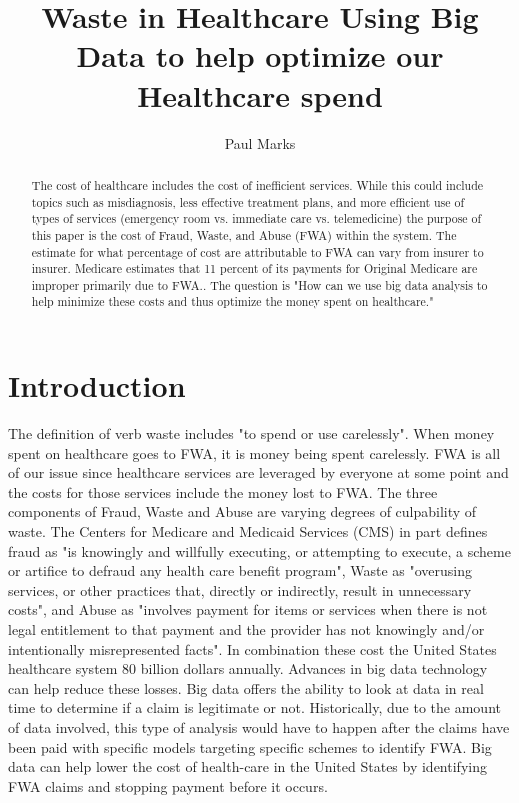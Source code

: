 \documentclass[sigconf]{acmart}
\begin{document}
\title{Waste in Healthcare
Using Big Data to help optimize our Healthcare spend}


\author{Paul Marks}


\begin{abstract}
The cost of healthcare includes the cost of inefficient services.  While this 
could include topics such as misdiagnosis, less effective treatment plans, 
and more efficient use of types of services (emergency room vs. immediate care 
vs. telemedicine) the purpose of this paper is the cost of Fraud, Waste, and 
Abuse (FWA) within the system.  The estimate for what percentage of cost are 
attributable to FWA can vary from insurer to insurer.  Medicare estimates that 
11 percent of its payments for Original Medicare are improper primarily due to 
FWA.\cite{FY2016HHSFR}.   The question is "How can we use big data analysis to 
help minimize these costs and thus optimize the money spent on healthcare."
\end{abstract}



\maketitle

\section{Introduction}

The definition of verb waste includes "to spend or use carelessly"\cite{WasteDef}.  
When money spent on healthcare goes to FWA, it is money being spent carelessly.  
FWA is all of our issue since healthcare services are leveraged by everyone at some 
point and the costs for those services include the money lost to FWA.  The three 
components of Fraud, Waste and Abuse are varying degrees of culpability of waste.  
The Centers for Medicare and Medicaid Services (CMS) in part defines fraud as "is 
knowingly and willfully executing, or attempting to execute, a scheme or artifice 
to defraud any health care benefit program", Waste as "overusing services, or other 
practices that, directly or indirectly, result in unnecessary costs", and Abuse as 
"involves payment for items or services when there is not legal entitlement to that 
payment and the provider has not knowingly and/or intentionally misrepresented 
facts"\cite{MLNFWA}.  In combination these cost the United States healthcare system 
80 billion dollars\cite{HFMA} annually.  
Advances in big data technology can help reduce these losses.  Big data offers the 
ability to look at data in real time to determine if a claim is legitimate or not.  
Historically, due to the amount of data involved, this type of analysis would have to 
happen after the claims have been paid with specific models targeting specific 
schemes to identify FWA.  Big data can help lower the cost of health-care in the 
United States by identifying FWA claims and stopping payment before it occurs. 
\end{document}
